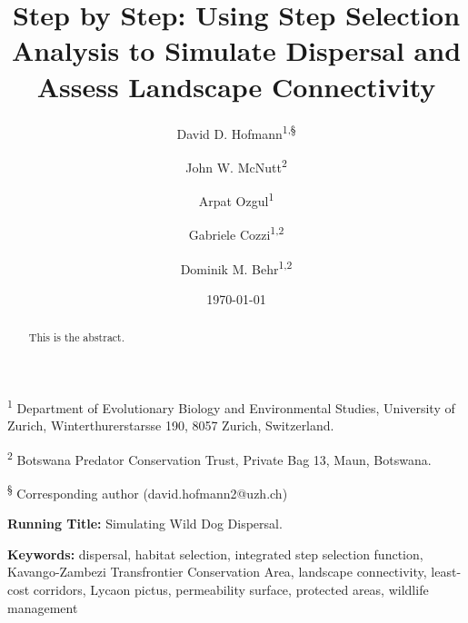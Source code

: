 \documentclass[abstract=on,10pt,a4paper,bibliography=totocnumbered]{article}
\title{Step by Step: Using Step Selection Analysis to Simulate Dispersal and
Assess Landscape Connectivity}
\author{
  David D. Hofmann\textsuperscript{1,\S} \and
  John W. McNutt\textsuperscript{2} \and
  Arpat Ozgul\textsuperscript{1} \and
  Gabriele Cozzi\textsuperscript{1,2} \and
  Dominik M. Behr\textsuperscript{1,2}
}
\date{\today}
\begin{document}



\maketitle

\begin{flushleft}

\vspace{0.5cm}

\textsuperscript{1} Department of Evolutionary Biology and Environmental
Studies, University of Zurich, Winterthurerstarsse 190, 8057 Zurich,
Switzerland.

\textsuperscript{2} Botswana Predator Conservation Trust, Private Bag 13, Maun,
Botswana.

\textsuperscript{\S} Corresponding author (david.hofmann2@uzh.ch)

\vspace{4cm}

\textbf{Running Title:} Simulating Wild Dog Dispersal.

\vspace{0.5cm}

\textbf{Keywords:} dispersal, habitat selection, integrated step selection
function, Kavango-Zambezi Transfrontier Conservation Area, landscape
connectivity, least-cost corridors, Lycaon pictus, permeability surface,
protected areas, wildlife management

\end{flushleft}

\newpage
\begin{abstract}
This is the abstract.
\end{abstract}

\newpage


\end{document}
